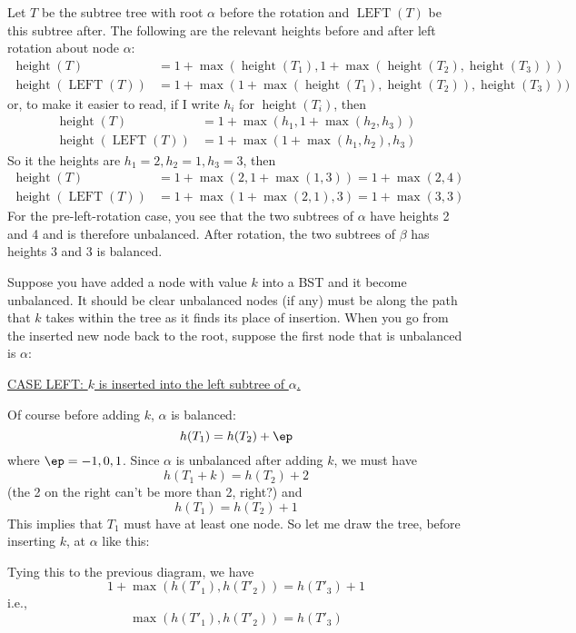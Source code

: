 Let $T$ be the subtree tree with root $\alpha$
before the rotation and $\operatorname{LEFT}(T)$
be this subtree after.
The following are the relevant heights before and after
left rotation about node $\alpha$:
\begin{align*}
  \operatorname{height}(T) &=
  1 +
  \max(\operatorname{height}(T_1),
  1 + \max(\operatorname{height}(T_2), \operatorname{height}(T_3)))
  \\
  \operatorname{height}(\operatorname{LEFT}(T)) &=
  1 + \max(1+\max(\operatorname{height}(T_1),\operatorname{height}(T_2)),
  \operatorname{height}(T_3)))
\end{align*}
or, to make it easier to read, if I write $h_i$ for
$\operatorname{height}(T_i)$, then
\begin{align*}
  \operatorname{height}(T) &=
  1 +
  \max(h_1,
  1 + \max(h_2, h_3))
  \\
  \operatorname{height}(\operatorname{LEFT}(T)) &=
  1 + \max(1+\max(h_1,h_2),h_3)
\end{align*}
So it the heights are $h_1=2, h_2=1, h_3=3$, then
\begin{align*}
  \operatorname{height}(T) &=
  1 +
  \max(2,
  1 + \max(1, 3)) = 1 + \max(2, 4)
  \\
  \operatorname{height}(\operatorname{LEFT}(T)) &=
  1 + \max(1+\max(2,1),3)
  = 1 + \max(3, 3)
\end{align*}
For the pre-left-rotation case, you see that the two subtrees of $\alpha$
have
heights 2 and 4 and is therefore unbalanced.
After rotation, the two subtrees of $\beta$ has heights $3$ and $3$ is
balanced.


Suppose you have added a node with value $k$ into a BST
and it become unbalanced.
It should be clear unbalanced nodes (if any)
must be along the path that $k$ takes within the tree
as it finds its place of insertion.
When you go from the inserted new node back to the root,
suppose the first node that is unbalanced is $\alpha$:


\underline{CASE LEFT: 
$k$ is inserted into the left subtree of $\alpha$.}

Of course before adding $k$, $\alpha$ is balanced:
\[
h(T_1) = h(T_2) + \ep
\]
where $\ep = -1, 0, 1$.
Since $\alpha$ is unbalanced  after adding $k$, we must have
\[
h(T_1 + k) = h(T_2) + 2
\]
(the 2 on the right can't be more than 2, right?)
and 
\[
h(T_1) = h(T_2) + 1
\]
This implies that $T_1$ must have at least one node.
So let me draw the tree, before inserting $k$, at $\alpha$ like this:

Tying this to the previous diagram, 
we have
\[
1 + \max(h(T'_1), h(T'_2)) = h(T'_3) + 1
\]
i.e., 
\[
\max(h(T'_1), h(T'_2)) = h(T'_3)
\]

